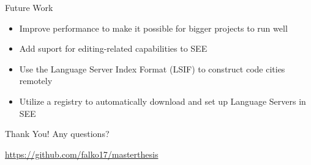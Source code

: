 \documentclass[xcolor={dvipsnames},aspectratio=169,compress]{beamer} %
\newcommand{\follows}{\raisebox{-0.7mm}{\scalebox{1.4}{\textcolor{Maroon}{\ding{43}}}}}
\newcommand{\answer}[1]{\begin{description}\item[\follows{}]{#1}\end{description}}
\begin{document}
%
%
%

\begin{frame}{Future Work}
	\begin{itemize}
		\item Improve performance to make it possible for bigger projects to run well
		\item Add suport for editing-related capabilities to SEE
		\item Use the Language Server Index Format (LSIF) to construct code cities remotely
		\item Utilize a registry to automatically download and set up Language Servers in SEE
	\end{itemize}
\end{frame}


\begin{frame}{Thank You!}
	\vspace{1cm}
	\centering
	\Large Any questions?
	\vspace{1cm}

	\vfill

	{\footnotesize \url{https://github.com/falko17/masterthesis}}
\end{frame}
\end{document}
